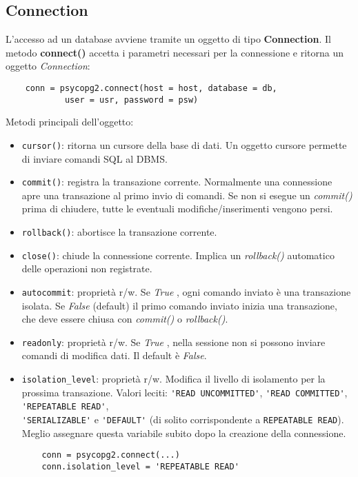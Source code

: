 \documentclass[a4paper, 10pt, titlepage]{article}
\begin{document}
	\subsection{Connection}
	L'accesso ad un database avviene tramite un oggetto di tipo \textbf{Connection}. Il metodo \textbf{connect()} accetta i parametri necessari per la connessione e ritorna un oggetto \textit{Connection}:
	\begin{lstlisting}
	conn = psycopg2.connect(host = host, database = db, 
			user = usr, password = psw)
	\end{lstlisting}
	Metodi principali dell'oggetto:
	\begin{itemize}
	\item \lstinline|cursor()|: ritorna un cursore della base di dati. Un oggetto cursore permette di inviare comandi SQL al DBMS.
	\item \lstinline[keywordstyle=\color{black}]|commit()|: registra la transazione corrente. Normalmente una connessione apre una transazione al primo invio di comandi. Se non si esegue un \textit{commit()} prima di chiudere, tutte le eventuali modifiche/inserimenti vengono persi.
	\item \lstinline[keywordstyle=\color{black}]|rollback()|: abortisce la transazione corrente.
	\item \lstinline|close()|: chiude la connessione corrente. Implica un \textit{rollback()} automatico delle operazioni non registrate.
	\item \lstinline|autocommit|: proprietà r/w. Se \textit{True} , ogni comando inviato è una transazione isolata. Se \textit{False} (default) il primo comando inviato inizia una transazione, che deve essere chiusa con \textit{commit()} o \textit{rollback()}.
	\item \lstinline|readonly|: proprietà r/w. Se \textit{True} , nella sessione non si possono inviare comandi di modifica dati. Il default è \textit{False}.
	\item \lstinline|isolation_level|: proprietà r/w. Modifica il livello di isolamento per la prossima transazione. Valori leciti: \lstinline|'READ UNCOMMITTED'|, \lstinline|'READ COMMITTED'|,  \lstinline|'REPEATABLE READ'|, \\ \lstinline|'SERIALIZABLE'| e  \lstinline|'DEFAULT'| (di solito corrispondente a \lstinline[keywordstyle=\color{black}]|REPEATABLE READ|). \\
 Meglio assegnare questa variabile subito dopo la creazione della connessione.
	\begin{lstlisting}
	conn = psycopg2.connect(...)
	conn.isolation_level = 'REPEATABLE READ'
	\end{lstlisting}
	\end{itemize}
	
\end{document}
